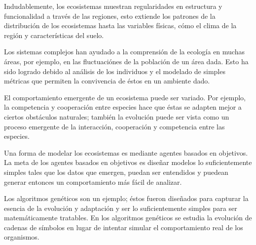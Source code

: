       Indudablemente, los ecosistemas muestran regularidades en estructura y funcionalidad a través de las regiones, esto extiende los patrones de la distribución de los ecosistemas hasta las variables físicas, cómo el clima de la región y características del suelo. \cite{7}

      Los sistemas complejos han ayudado a la comprensión de la ecología en muchas áreas, por ejemplo, en las fluctuaciónes de la población de un área dada. Esto ha sido logrado debido al análisis de los individuos y el modelado de simples métricas que permiten la convivencia de éstos en un ambiente dado.

      El comportamiento emergente de un ecosistema puede ser variado. Por ejemplo, la competencia y cooperación entre especies hace que éstas se adapten mejor a ciertos obstáculos naturales; también la evolución puede ser vista como un proceso emergente de la interacción, cooperación y competencia entre las especies.

      Una forma de modelar los ecosistemas es mediante agentes basados en objetivos. La meta de los agentes basados en objetivos es diseñar modelos lo suficientemente simples tales que los datos que emergen, puedan ser entendidos y puedean generar entonces un comportamiento más fácil de analizar.

      Los algoritmos genéticos son un ejemplo; éstos fueron diseñados para capturar la esencia de la evolución y adaptación y ser lo suficientemente simples para ser matemáticamente tratables. En los algoritmos genéticos se estudia la evolución de cadenas de símbolos en lugar de intentar simular el comportamiento real de los organismos. \cite{8}
